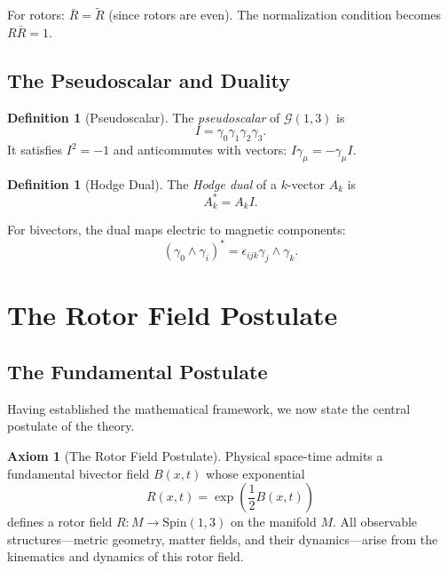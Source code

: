 \documentclass[11pt,a4paper]{article}
\numberwithin{equation}{section}
\theoremstyle{plain}
\theoremstyle{definition}
\newtheorem{definition}[theorem]{Definition}
\newtheorem{axiom}[theorem]{Axiom}
\theoremstyle{remark}
\newcommand{\Cl}{\mathcal{G}}               %
\newcommand{\rev}[1]{\widetilde{#1}}       %
\newcommand{\dual}[1]{#1^\ast}             %
\newcommand{\Spin}{\mathrm{Spin}}
\begin{document}
For rotors: $\bar{R} = \rev{R}$ (since rotors are even). The normalization condition becomes $R \bar{R} = 1$.

\subsection{The Pseudoscalar and Duality}

\begin{definition}[Pseudoscalar]
The \emph{pseudoscalar} of $\Cl(1,3)$ is
\begin{equation}
I = \gamma_0 \gamma_1 \gamma_2 \gamma_3.
\label{eq:pseudoscalar}
\end{equation}
It satisfies $I^2 = -1$ and anticommutes with vectors: $I\gamma_\mu = -\gamma_\mu I$.
\end{definition}

\begin{definition}[Hodge Dual]
The \emph{Hodge dual} of a $k$-vector $A_k$ is
\begin{equation}
\dual{A_k} = A_k I.
\end{equation}
\end{definition}

For bivectors, the dual maps electric to magnetic components:
\begin{equation}
\dual{(\gamma_0 \wedge \gamma_i)} = \epsilon_{ijk}\gamma_j \wedge \gamma_k.
\end{equation}

\section{The Rotor Field Postulate}
\label{sec:rotor-postulate}

\subsection{The Fundamental Postulate}

Having established the mathematical framework, we now state the central postulate of the theory.

\begin{axiom}[The Rotor Field Postulate]
Physical space-time admits a fundamental bivector field $B(x,t)$ whose exponential
\begin{equation}
R(x,t) = \exp\left(\frac{1}{2}B(x,t)\right)
\label{eq:rotor-field-def}
\end{equation}
defines a rotor field $R: M \to \Spin(1,3)$ on the manifold $M$. All observable structures—metric geometry, matter fields, and their dynamics—arise from the kinematics and dynamics of this rotor field.
\end{axiom}
\end{document}
